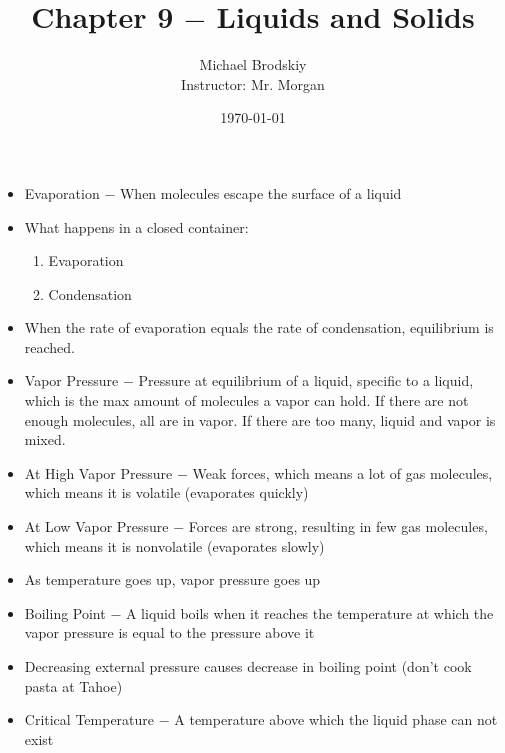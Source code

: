 \documentclass[12pt]{article}
\title{Chapter 9 $-$ Liquids and Solids}
\date{\today}
\author{Michael Brodskiy\\ \small Instructor: Mr. Morgan}
\begin{document}
\maketitle

\begin{itemize}

  \item Evaporation $-$ When molecules escape the surface of a liquid

  \item What happens in a closed container:

    \begin{enumerate}

      \item Evaporation

      \item Condensation

    \end{enumerate}

  \item When the rate of evaporation equals the rate of condensation, equilibrium is reached.

  \item Vapor Pressure $-$ Pressure at equilibrium of a liquid, specific to a liquid, which is the max amount of molecules a vapor can hold. If there are not enough molecules, all are in vapor. If there are too many, liquid and vapor is mixed.

\item At High Vapor Pressure $-$ Weak forces, which means a lot of gas molecules, which means it is volatile (evaporates quickly)

\item At Low Vapor Pressure $-$ Forces are strong, resulting in few gas molecules, which means it is nonvolatile (evaporates slowly)

\item As temperature goes up, vapor pressure goes up

\item Boiling Point $-$ A liquid boils when it reaches the temperature at which the vapor pressure is equal to the pressure above it

\item Decreasing external pressure causes decrease in boiling point (don't cook pasta at Tahoe)

\item Critical Temperature $-$ A temperature above which the liquid phase can not exist


\end{itemize}
\end{document}

